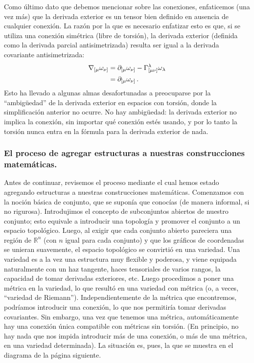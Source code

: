 \documentclass[11pt,b5paper,openany,twoside]{book}
\newcommand{\mn}{{\mu\nu}}
\newcommand{\p}[1]{{\partial_{#1}}}
\newcommand{\R}{\mathbb{R}}
\begin{document}
Como último dato que debemos mencionar sobre las conexiones, enfaticemos (una vez más) que la derivada exterior es un tensor bien definido en ausencia de cualquier conexión.
La razón por la que es necesario enfatizar esto es que, si se utiliza una conexión simétrica (libre de torsión), la derivada exterior (definida como la derivada parcial antisimetrizada) resulta ser igual a la derivada covariante antisimetrizada:
\begin{align}
\nabla_{[\mu}\omega_{\nu]} &=  \p{[\mu}\omega_{\nu]}
-\Gamma^\lambda_{[\mn]}\omega_\lambda  \notag \\
&=  \p{[\mu}\omega_{\nu]}\,. \label{3.29}
\end{align}
Esto ha llevado a algunas almas desafortunadas a preocuparse por la ``ambigüedad'' de la derivada exterior en espacios con torsión, donde la simplificación anterior no ocurre.
No hay ambigüedad: la derivada exterior no implica la conexión, sin importar qué conexión estés usando, y por lo tanto la torsión nunca entra en la fórmula para la derivada exterior de nada.

\subsubsection{El proceso de agregar estructuras a nuestras construcciones matemáticas.}

Antes de continuar, revisemos el proceso mediante el cual hemos estado agregando estructuras a nuestras construcciones matemáticas.
Comenzamos con la noción básica de conjunto, que se suponía que conocías (de manera informal, si no rigurosa).
Introdujimos el concepto de subconjuntos abiertos de nuestro conjunto; esto equivale a introducir una topología y promover el conjunto a un espacio topológico.
Luego, al exigir que cada conjunto abierto pareciera una región de $\R^n$ (con $n$ igual para cada conjunto) y que los gráficos de coordenadas se unieran suavemente, el espacio topológico se convirtió en una variedad.
Una variedad es a la vez una estructura muy flexible y poderosa, y viene equipada naturalmente con un haz tangente, haces tensoriales de varios rangos, la capacidad de tomar derivadas exteriores, etc.
Luego procedimos a poner una métrica en la variedad, lo que resultó en una variedad con métrica (o, a veces, ``variedad de Riemann'').
Independientemente de la métrica que encontremos, podríamos introducir una conexión, lo que nos permitiría tomar derivadas covariantes.
Sin embargo, una vez que tenemos una métrica, automáticamente hay una conexión única compatible con métricas sin torsión.
(En principio, no hay nada que nos impida introducir más de una conexión, o más de una métrica, en una variedad determinada).
La situación es, pues, la que se muestra en el diagrama de la página siguiente.
\end{document}
